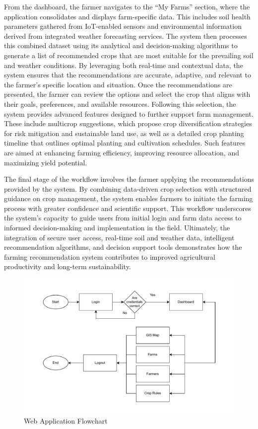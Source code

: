{	From the dashboard, the farmer navigates to the “My Farms” section, where the application consolidates and displays farm-specific data. This includes soil health parameters gathered from IoT-enabled sensors and environmental information derived from integrated weather forecasting services. The system then processes this combined dataset using its analytical and decision-making algorithms to generate a list of recommended crops that are most suitable for the prevailing soil and weather conditions. By leveraging both real-time and contextual data, the system ensures that the recommendations are accurate, adaptive, and relevant to the farmer’s specific location and situation. Once the recommendations are presented, the farmer can review the options and select the crop that aligns with their goals, preferences, and available resources. Following this selection, the system provides advanced features designed to further support farm management. These include multicrop suggestions, which propose crop diversification strategies for risk mitigation and sustainable land use, as well as a detailed crop planting timeline that outlines optimal planting and cultivation schedules. Such features are aimed at enhancing farming efficiency, improving resource allocation, and maximizing yield potential.
	
	The final stage of the workflow involves the farmer applying the recommendations provided by the system. By combining data-driven crop selection with structured guidance on crop management, the system enables farmers to initiate the farming process with greater confidence and scientific support. This workflow underscores the system’s capacity to guide users from initial login and farm data access to informed decision-making and implementation in the field. Ultimately, the integration of secure user access, real-time soil and weather data, intelligent recommendation algorithms, and decision support tools demonstrates how the farming recommendation system contributes to improved agricultural productivity and long-term sustainability.
	
	\begin{figure}[H]
		\centering
		\caption{Web Application Flowchart}
		\label{fig:WebFlowchart}
		\includegraphics[width=1\textwidth]{figures/web flow.pdf}
	\end{figure}
	
}
